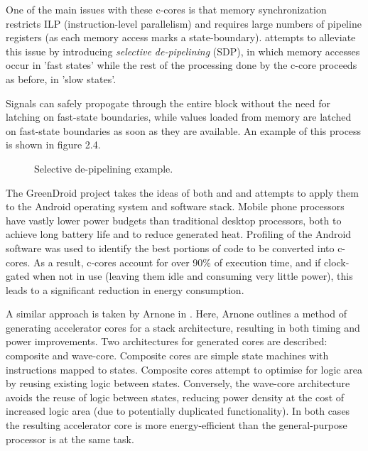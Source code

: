 \documentclass{UoYCSproject}
\begin{document}
One of the main issues with these c-cores is that memory synchronization restricts ILP (instruction-level parallelism)
and requires large numbers of pipeline registers (as each memory access marks a state-boundary). \cite{eco-cores} attempts
to alleviate this issue by introducing \textit{selective de-pipelining} (SDP), in which memory accesses occur in 'fast states'
while the rest of the processing done by the c-core proceeds as before, in 'slow states'.

Signals can safely propogate through the entire block without the need for latching on fast-state boundaries,
while values loaded from memory are latched on fast-state boundaries as soon as they are available.
An example of this process is shown in figure 2.4.

\begin{figure}[h]
\caption{Selective de-pipelining example. \cite{eco-cores}}
\end{figure}

The GreenDroid project \cite{greendroid} takes the ideas of both \cite{c-cores} and \cite{eco-cores} and attempts
to apply them to the Android operating system and software stack. Mobile phone processors have vastly lower power budgets than
traditional desktop processors, both to achieve long battery life and to reduce generated heat. Profiling of the Android
software was used to identify the best portions of code to be converted into c-cores. As a result,
c-cores account for over 90\% of execution time, and if clock-gated when not in use (leaving them idle and consuming
very little power), this leads to a significant reduction in energy consumption.

A similar approach is taken by Arnone in \cite{arnone-thesis}. Here, Arnone outlines a method of
generating accelerator cores for a stack architecture, resulting in both timing
and power improvements. Two architectures for generated cores are described: composite and wave-core.
Composite cores are simple state machines with instructions mapped to states. Composite cores attempt to
optimise for logic area by reusing existing logic between states. Conversely, the wave-core
architecture avoids the reuse of logic between states, reducing power density at the cost of increased
logic area (due to potentially duplicated functionality). In both cases the resulting accelerator core is
more energy-efficient than the general-purpose processor is at the same task.
\end{document}
